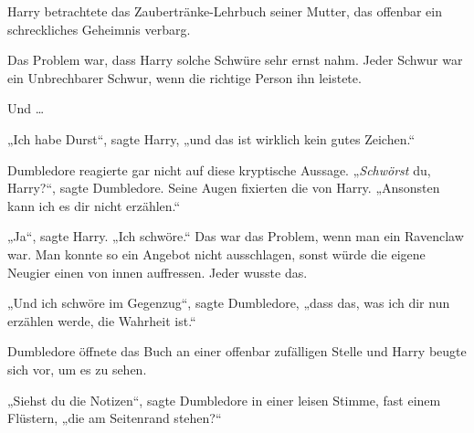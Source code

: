 Harry betrachtete das Zaubertränke-Lehrbuch seiner Mutter, das offenbar ein schreckliches Geheimnis verbarg.

Das Problem war, dass Harry solche Schwüre sehr ernst nahm. Jeder Schwur war ein Unbrechbarer Schwur, wenn die richtige Person ihn leistete.

Und …

„Ich habe Durst“, sagte Harry, „und das ist wirklich kein gutes Zeichen.“

Dumbledore reagierte gar nicht auf diese kryptische Aussage. „\emph{Schwörst} du, Harry?“, sagte Dumbledore. Seine Augen fixierten die von Harry. „Ansonsten kann ich es dir nicht erzählen.“

„Ja“, sagte Harry. „Ich schwöre.“ Das war das Problem, wenn man ein Ravenclaw war. Man konnte so ein Angebot nicht ausschlagen, sonst würde die eigene Neugier einen von innen auffressen. Jeder wusste das.

„Und ich schwöre im Gegenzug“, sagte Dumbledore, „dass das, was ich dir nun erzählen werde, die Wahrheit ist.“

Dumbledore öffnete das Buch an einer offenbar zufälligen Stelle und Harry beugte sich vor, um es zu sehen.

„Siehst du die Notizen“, sagte Dumbledore in einer leisen Stimme, fast einem Flüstern, „die am Seitenrand stehen?“

